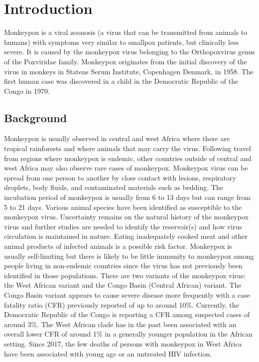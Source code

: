 \chapter{Introduction}
Monkeypox is a viral zoonosis (a virus that can be transmitted from animals to humans) with symptoms very similar to smallpox patients, but clinically less severe. It is caused by the monkeypox virus belonging to the Orthopoxvirus genus of the Poxviridae family. Monkeypox originates from the initial discovery of the virus in monkeys in Statens Serum Institute, Copenhagen Denmark, in 1958. The first human case was discovered in a child in the Democratic Republic of the Congo in 1970.

\section{Background}
Monkeypox is usually observed in central and west Africa where there are tropical rainforests and where animals that may carry the virus. Following travel from regions where monkeypox is endemic, other countries outside of central and west Africa may also observe rare cases of monkeypox.
Monkeypox virus can be spread from one person to another by close contact with lesions, respiratory droplets, body fluids, and contaminated materials such as bedding. The incubation period of monkeypox is usually from 6 to 13 days but can range from 5 to 21 days.
Various animal species have been identified as susceptible to the monkeypox virus. Uncertainty remains on the natural history of the monkeypox virus and further studies are needed to identify the reservoir(s) and how virus circulation is maintained in nature. Eating inadequately cooked meat and other animal products of infected animals is a possible risk factor.
Monkeypox is usually self-limiting but there is likely to be little immunity to monkeypox among people living in non-endemic countries since the virus has not previously been identified in those populations. There are two variants of the monkeypox virus: the West African variant and the Congo Basin (Central African) variant. The Congo Basin variant appears to cause severe disease more frequently with a case fatality ratio (CFR) previously reported of up to around 10\%. Currently, the Democratic Republic of the Congo is reporting a CFR among suspected cases of around 3\%. The West African clade has in the past been associated with an overall lower CFR of around 1\% in a generally younger population in the African setting. Since 2017, the few deaths of persons with monkeypox in West Africa have been associated with young age or an untreated HIV infection.

